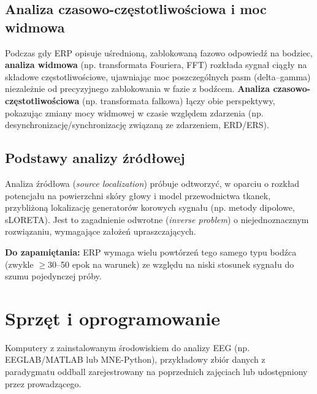 \documentclass[11pt,a4paper]{article}
\newcommand{\infobox}[1]{%
  \par\noindent\colorbox{lgray}{\parbox{\dimexpr\linewidth-2\fboxsep}{\vspace{2pt}#1\vspace{2pt}}}\par\vspace{4pt}}
\begin{document}
\subsection{Analiza czasowo-częstotliwościowa i moc widmowa}
Podczas gdy ERP opisuje uśrednioną, zablokowaną fazowo odpowiedź na bodziec, \textbf{analiza widmowa} (np. transformata Fouriera, FFT) rozkłada sygnał ciągły na składowe częstotliwościowe, ujawniając moc poszczególnych pasm (delta--gamma) niezależnie od precyzyjnego zablokowania w fazie z bodźcem. \textbf{Analiza czasowo-częstotliwościowa} (np. transformata falkowa) łączy obie perspektywy, pokazując zmiany mocy widmowej w czasie względem zdarzenia (np. desynchronizację/synchronizację związaną ze zdarzeniem, ERD/ERS).

\subsection{Podstawy analizy źródłowej}
Analiza źródłowa (\emph{source localization}) próbuje odtworzyć, w oparciu o rozkład potencjału na powierzchni skóry głowy i model przewodnictwa tkanek, przybliżoną lokalizację generatorów korowych sygnału (np. metody dipolowe, sLORETA). Jest to zagadnienie odwrotne (\emph{inverse problem}) o niejednoznacznym rozwiązaniu, wymagające założeń upraszczających.

\infobox{\textbf{Do zapamiętania:} ERP wymaga wielu powtórzeń tego samego typu bodźca (zwykle $\geq$30--50 epok na warunek) ze względu na niski stosunek sygnału do szumu pojedynczej próby.}

\section{Sprzęt i oprogramowanie}
Komputery z zainstalowanym środowiskiem do analizy EEG (np. EEGLAB/MATLAB lub MNE-Python), przykładowy zbiór danych z paradygmatu oddball zarejestrowany na poprzednich zajęciach lub udostępniony przez prowadzącego.
\end{document}
